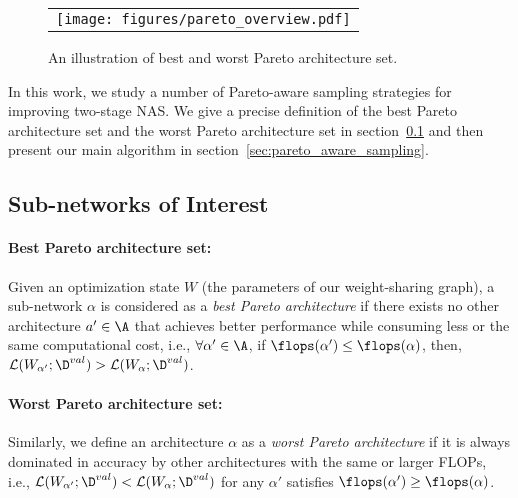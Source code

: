 \documentclass[final]{cvpr}
\theoremstyle{definition}
\begin{document}
\begin{figure}[t]
\centering
\begin{tabular}{c}
\texttt{[image: figures/pareto\_overview.pdf]}\\
\end{tabular}
\caption{ An illustration of best and worst Pareto architecture set. }
\label{fig:pareto_set}
\end{figure}

In this work, we study a number of Pareto-aware sampling strategies for improving 
two-stage NAS. We give a precise definition of the best {Pareto} architecture set and the worst {Pareto} architecture set in section~\ref{sec:pareto_set} 
and then present our main algorithm in section~\ref{sec:pareto_aware_sampling}. 

\subsection{Sub-networks of Interest}
\label{sec:pareto_set}

\paragraph{Best Pareto architecture set:}
Given an optimization state $W$ (the parameters of our weight-sharing graph), 
a sub-network $\alpha$ is considered as a \emph{best Pareto architecture} if there exists no other architecture $a'\in \A$ that achieves better performance while consuming less or the same computational cost,  
i.e., $\forall \alpha^{\prime} \in \A$, if $\flops(\alpha') \le \flops(\alpha)$, then, $\L(W_{\alpha'}; \D^{val}) > \L(W_{\alpha};\D^{val})$.


\paragraph{Worst Pareto architecture set:}
Similarly, we define an architecture $\alpha$ as a \emph{worst Pareto architecture} if it is always dominated in accuracy by other architectures with the same or larger FLOPs, i.e., 
$\L(W_{\alpha'}; \D^{val}) < \L(W_\alpha; \D^{val})$ for any $\alpha'$ satisfies $\flops(\alpha') \ge \flops(\alpha)$.

\iffalse 
One the one hand, 
one might put more training budgets on models that are likely to form the Pareto frontier,
such that the Pareto set of models 
are trained with more data.
In practice, increasing training computation resource has been
proven to be an effective technique in improving DNN performance.
On the other hand, 
it is probably also important to improve the worst performing models. 
Intuitively, all neurons contribute to the final performance
in a collaborative way. 
It is important to ensure all neurons are well trained to reach
their maximum potential abilities. 
This idea is similar to \emph{hard example mining},
which has demonstrated remarkable success in object detection \cite{shrivastava2016training},  and many more. 
\red{better arguments..}
\fi
\end{document}
